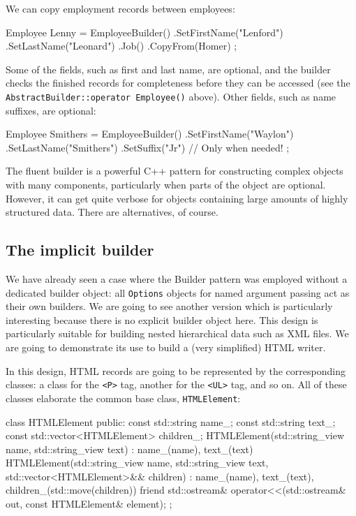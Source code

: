 We can copy employment records between employees:

\begin{code}
Employee Lenny = EmployeeBuilder()
  .SetFirstName("Lenford")
  .SetLastName("Leonard")
  .Job()
    .CopyFrom(Homer)
;
\end{code}

Some of the fields, such as first and last name, are optional, and the builder checks the finished records for completeness before they can be accessed (see the \texttt{AbstractBuilder::operator\ Employee()} above). Other fields, such as name suffixes, are optional:

\begin{code}
Employee Smithers = EmployeeBuilder()
  .SetFirstName("Waylon")
  .SetLastName("Smithers")
  .SetSuffix("Jr") // Only when needed!
;
\end{code}

The fluent builder is a powerful C++ pattern for constructing complex objects with many components, particularly when parts of the object are optional. However, it can get quite verbose for objects containing large amounts of highly structured data. There are alternatives, of course.

\subsection{The implicit builder}

We have already seen a case where the Builder pattern was employed without a dedicated builder object: all \texttt{Options} objects for named argument passing act as their own builders. We are going to see another version which is particularly interesting because there is no explicit builder object here. This design is particularly suitable for building nested hierarchical data such as XML files. We are going to demonstrate its use to build a (very simplified) HTML writer.

In this design, HTML records are going to be represented by the corresponding classes: a class for the \texttt{\textless{}P\textgreater{}} tag, another for the \texttt{\textless{}UL\textgreater{}} tag, and so on. All of these classes elaborate the common base class, \texttt{HTMLElement}:

\begin{code}
class HTMLElement {
  public:
  const std::string name_;
  const std::string text_;
  const std::vector<HTMLElement> children_;
  HTMLElement(std::string_view name, std::string_view text)
    : name_(name), text_(text) {}
  HTMLElement(std::string_view name, std::string_view text,
              std::vector<HTMLElement>&& children)
    : name_(name), text_(text),
      children_(std::move(children)) {}
  friend std::ostream& operator<<(std::ostream& out,
    const HTMLElement& element);
};
\end{code}

